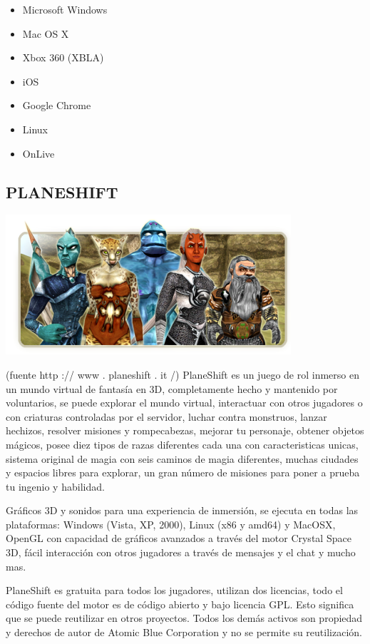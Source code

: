 \begin{itemize}
\item Microsoft Windows
\item Mac OS X
\item Xbox 360 (XBLA)
\item iOS
\item Google Chrome
\item Linux
\item OnLive
\end{itemize}

\subsection*{PLANESHIFT}
\includegraphics[scale=0.5]{img/cp07/img0703.png}

(fuente http :// www . planeshift . it /)
PlaneShift es un juego de rol inmerso en un mundo virtual de
fantasía en 3D, completamente hecho y mantenido por
voluntarios, se puede explorar el mundo virtual, interactuar con
otros jugadores o con criaturas controladas por el servidor,
luchar contra monstruos, lanzar hechizos, resolver misiones y
rompecabezas, mejorar tu personaje, obtener objetos mágicos,
posee diez tipos de razas diferentes cada una con caracteristicas
unicas, sistema original de magia con seis caminos de magia
diferentes, muchas ciudades y espacios libres para explorar, un
gran número de misiones para poner a prueba tu ingenio y
habilidad.

Gráficos 3D y sonidos para una experiencia de inmersión, se
ejecuta en todas las plataformas: Windows (Vista, XP, 2000),
Linux (x86 y amd64) y MacOSX, OpenGL con capacidad de
gráficos avanzados a través del motor Crystal Space 3D,
fácil interacción con otros jugadores a través de mensajes y el
chat y mucho mas.

PlaneShift es gratuita para todos los jugadores, utilizan dos
licencias, todo el código fuente del motor es de código abierto y
bajo licencia GPL. Esto significa que se puede reutilizar en otros
proyectos. Todos los demás activos son propiedad y derechos de
autor de Atomic Blue Corporation y no se permite su
reutilización.


